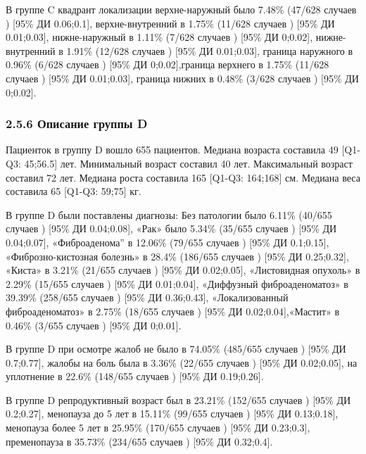 \documentclass[
]{article}
\begin{document}
В группе C квадрант локализации верхне-наружный было 7.48\% (47/628
случаев ) {[}95\% ДИ 0.06;0.1{]}, верхне-внутренний в 1.75\% (11/628
случаев ) {[}95\% ДИ 0.01;0.03{]}, нижне-наружный в 1.11\% (7/628
случаев ) {[}95\% ДИ 0;0.02{]}, нижне-внутренний в 1.91\% (12/628
случаев ) {[}95\% ДИ 0.01;0.03{]}, граница наружного в 0.96\% (6/628
случаев ) {[}95\% ДИ 0;0.02{]},граница верхнего в 1.75\% (11/628 случаев
) {[}95\% ДИ 0.01;0.03{]}, граница нижних в 0.48\% (3/628 случаев )
{[}95\% ДИ 0;0.02{]}.

\hypertarget{ux43eux43fux438ux441ux430ux43dux438ux435-ux433ux440ux443ux43fux43fux44b-d}{%
\subsubsection{2.5.6 Описание группы
D}\label{ux43eux43fux438ux441ux430ux43dux438ux435-ux433ux440ux443ux43fux43fux44b-d}}

Пациенток в группу D вошло 655 пациентов. Медиана возраста составила 49
{[}Q1-Q3: 45;56.5{]} лет. Минимальный возраст составил 40 лет.
Максимальный возраст составил 72 лет. Медиана роста составила 165
{[}Q1-Q3: 164;168{]} см. Медиана веса составила 65 {[}Q1-Q3: 59;75{]}
кг.

В группе D были поставлены диагнозы: Без патологии было 6.11\% (40/655
случаев ) {[}95\% ДИ 0.04;0.08{]}, «Рак» было 5.34\% (35/655 случаев )
{[}95\% ДИ 0.04;0.07{]}, «Фиброаденома'' в 12.06\% (79/655 случаев )
{[}95\% ДИ 0.1;0.15{]}, «Фиброзно-кистозная болезнь» в 28.4\% (186/655
случаев ) {[}95\% ДИ 0.25;0.32{]}, «Киста» в 3.21\% (21/655 случаев )
{[}95\% ДИ 0.02;0.05{]}, «Листовидная опухоль» в 2.29\% (15/655 случаев
) {[}95\% ДИ 0.01;0.04{]}, «Диффузный фиброаденоматоз» в 39.39\%
(258/655 случаев ) {[}95\% ДИ 0.36;0.43{]}, «Локализованный
фиброаденоматоз» в 2.75\% (18/655 случаев ) {[}95\% ДИ
0.02;0.04{]},«Мастит» в 0.46\% (3/655 случаев ) {[}95\% ДИ 0;0.01{]}.

В группе D при осмотре жалоб не было в 74.05\% (485/655 случаев )
{[}95\% ДИ 0.7;0.77{]}, жалобы на боль была в 3.36\% (22/655 случаев )
{[}95\% ДИ 0.02;0.05{]}, на уплотнение в 22.6\% (148/655 случаев )
{[}95\% ДИ 0.19;0.26{]}.

В группе D репродуктивный возраст был в 23.21\% (152/655 случаев )
{[}95\% ДИ 0.2;0.27{]}, менопауза до 5 лет в 15.11\% (99/655 случаев )
{[}95\% ДИ 0.13;0.18{]}, менопауза более 5 лет в 25.95\% (170/655
случаев ) {[}95\% ДИ 0.23;0.3{]}, пременопауза в 35.73\% (234/655
случаев ) {[}95\% ДИ 0.32;0.4{]}.
\end{document}
